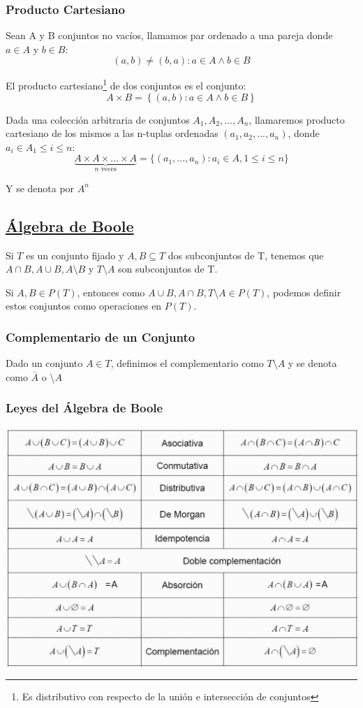 \documentclass[10pt,a4paper,openright]{book}
\begin{document}
\subsubsection*{Producto Cartesiano}
Sean A y B conjuntos no vacíos, llamamos par ordenado a una pareja donde $a \in A$ y $b \in B$:
$$(a,b)\neq (b,a) : a\in A \wedge b\in B$$

El producto cartesiano\footnote{Es distributivo con respecto de la unión e intersección de conjuntos} de dos conjuntos es el conjunto:
$$A\times B=\left\lbrace (a,b) : a \in A \wedge b \in B\right\rbrace$$

Dada una colección arbitraria de conjuntos $A_1,A_2,...,A_n$, llamaremos producto cartesiano de los mismos a las n-tuplas ordenadas $(a_1,a_2, ..., a_n)$, donde $a_i\in A_ 1\leq i\leq n$:
$$\underbrace{A\times A\times ... \times A}_{n\mbox{ veces}}=\{(a_1, ..., a_n): a_i\in A, 1\leq i\leq n\}$$

Y se denota por $A^n$

\subsection*{\underline{Álgebra de Boole}}
Si $T$ es un conjunto fijado y $A,B\subseteq T$ dos subconjuntos de T, tenemos que $A\cap B, A\cup B, A\mbox{\textbackslash}B$ y $T\mbox{\textbackslash}A$ son subconjuntos de T.\par
Si $A,B\in P(T)$, entonces como $A\cup B, A\cap B, T\mbox{\textbackslash} A\in P(T)$, podemos definir estos conjuntos como operaciones en $P(T)$.

\subsubsection*{Complementario de un Conjunto}
Dado un conjunto $A\in T$, definimos el complementario como $T\mbox{\textbackslash}A$ y se denota como $\bar{A}$ o \textbackslash$A$

\subsubsection*{Leyes del Álgebra de Boole}
\begin{center}
\includegraphics[scale=0.45]{leyes de boole}
\end{center}
\end{document}
